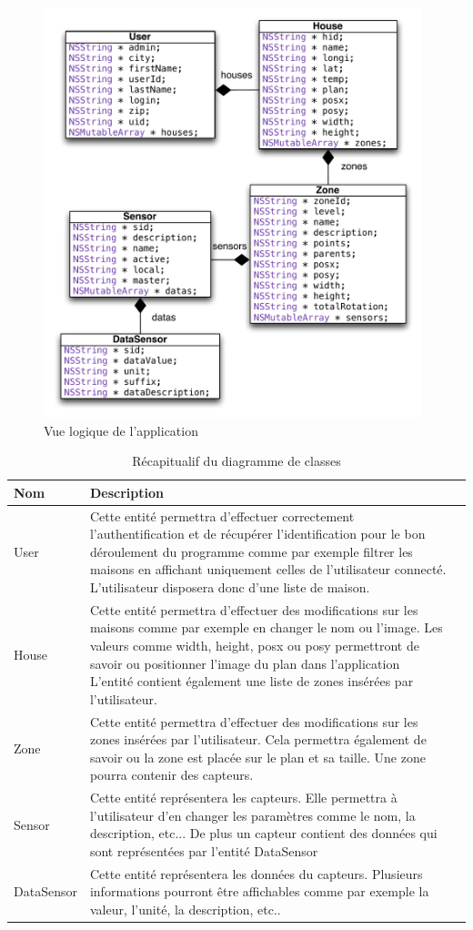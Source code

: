 \begin{figure}[H]
        \centering
        \includegraphics[width=11cm]{00_media/04_Client_Diagramme_classe_metier.pdf}
        \caption{Vue logique de l'application}
        \label{gra:vueLogApp}
\end{figure}

\begin{table}[H]
\begin{tabularx}{\textwidth}{|m{3cm}|X|l|}
  \hline
  \bf{Nom} & \bf{Description} \\
  \hline
  User & Cette entité permettra d'effectuer correctement l'authentification et de récupérer l'identification pour le bon déroulement du programme comme par exemple filtrer les maisons en affichant uniquement celles de l'utilisateur connecté. L'utilisateur disposera donc d'une liste de maison. \\
  \hline  
  House & Cette entité permettra d'effectuer des modifications sur les maisons comme par exemple en changer le nom ou l'image. Les valeurs comme width, height,  posx ou posy permettront de savoir ou positionner l'image du plan dans l'application L'entité contient également une liste de zones insérées par l'utilisateur.\\
  \hline  
  Zone & Cette entité permettra d'effectuer des modifications sur les zones insérées par l'utilisateur. Cela permettra également de savoir ou la zone est placée sur le plan et sa taille. Une zone pourra contenir des capteurs. \\
  \hline  
  Sensor & Cette entité représentera les capteurs. Elle permettra à l'utilisateur d'en changer les paramètres comme le nom, la description, etc... De plus un capteur contient des données qui sont représentées par l'entité DataSensor \\
  \hline  
  DataSensor & Cette entité représentera les données du capteurs. Plusieurs informations pourront être affichables comme par exemple la valeur, l'unité, la description, etc.. \\
  \hline
\end{tabularx}
\caption{Récapitualif du diagramme de classes}
\label{tab:classDiagram}
\end{table}

